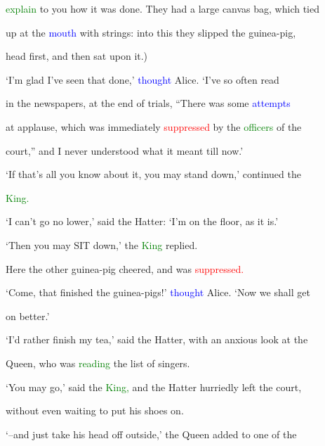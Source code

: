  \textcolor{green}{explain} to you how it was done. They had a large canvas bag, which tied

 up at the \textcolor{blue}{mouth} with strings: into this they \textcolor{BurntOrange}{slipped} the guinea-pig,

 head first, and then sat upon it.)



 ‘I’m \textcolor{BurntOrange}{glad} I’ve seen that done,’ \textcolor{blue}{thought} Alice. ‘I’ve so often read

 in the newspapers, at the end of trials, “There was some \textcolor{blue}{attempts}

 at \textcolor{BurntOrange}{applause,} which was \textcolor{BurntOrange}{immediately} \textcolor{red}{suppressed} by the \textcolor{green}{officers} of the

 \textcolor{BurntOrange}{court,”} and I never understood what it meant till now.’



 ‘If that’s all you know about it, you may stand down,’ continued the

 \textcolor{green}{King.}



 ‘I can’t go no lower,’ said the Hatter: ‘I’m on the floor, as it is.’



 ‘Then you may SIT down,’ the \textcolor{green}{King} replied.



 Here the other guinea-pig \textcolor{BurntOrange}{cheered,} and was \textcolor{red}{suppressed.}



 ‘Come, that finished the guinea-pigs!’ \textcolor{blue}{thought} Alice. ‘Now we shall get

 on better.’



 ‘I’d rather finish my tea,’ said the Hatter, with an \textcolor{BurntOrange}{anxious} look at the

 Queen, who was \textcolor{green}{reading} the list of singers.



 ‘You may go,’ said the \textcolor{green}{King,} and the Hatter hurriedly left the \textcolor{BurntOrange}{court,}

 without even \textcolor{BurntOrange}{waiting} to put his shoes on.



 ‘--and just take his head off outside,’ the Queen added to one of the

